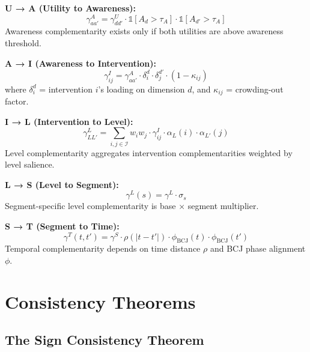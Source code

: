 \begin{tcolorbox}[colback=gray!5!white, colframe=gray!75!black,
    title=Theorem GTC-2: Transmission Equations]

\textbf{U → A (Utility to Awareness):}
\begin{equation}
\gamma^A_{aa'} = \gamma^U_{dd'} \cdot \mathbb{1}[A_d > \tau_A] \cdot \mathbb{1}[A_{d'} > \tau_A]
\end{equation}
Awareness complementarity exists only if both utilities are above awareness threshold.

\textbf{A → I (Awareness to Intervention):}
\begin{equation}
\gamma^I_{ij} = \gamma^A_{aa'} \cdot \delta_i^d \cdot \delta_j^{d'} \cdot (1 - \kappa_{ij})
\end{equation}
where $\delta_i^d$ = intervention $i$'s loading on dimension $d$, and
$\kappa_{ij}$ = crowding-out factor.

\textbf{I → L (Intervention to Level):}
\begin{equation}
\gamma^L_{LL'} = \sum_{i,j \in \mathcal{I}} w_i w_j \cdot \gamma^I_{ij} \cdot \alpha_L(i) \cdot \alpha_{L'}(j)
\end{equation}
Level complementarity aggregates intervention complementarities weighted by
level salience.

\textbf{L → S (Level to Segment):}
\begin{equation}
\gamma^L(s) = \gamma^L \cdot \sigma_s
\end{equation}
Segment-specific level complementarity is base $\times$ segment multiplier.

\textbf{S → T (Segment to Time):}
\begin{equation}
\gamma^T(t, t') = \gamma^S \cdot \rho(|t - t'|) \cdot \phi_{\text{BCJ}}(t) \cdot \phi_{\text{BCJ}}(t')
\end{equation}
Temporal complementarity depends on time distance $\rho$ and BCJ phase alignment $\phi$.

\end{tcolorbox}

\section{Consistency Theorems}
\label{sec:gtc-consistency}

\subsection{The Sign Consistency Theorem}

